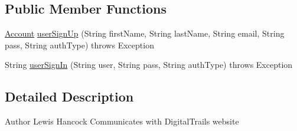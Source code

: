 \subsection*{Public Member Functions}
\begin{DoxyCompactItemize}
\item 
\hyperlink{classuk_1_1ac_1_1swan_1_1digitaltrails_1_1components_1_1_account}{Account} \hyperlink{classuk_1_1ac_1_1swan_1_1digitaltrails_1_1accounts_1_1_digital_trails_com_server_authenticate_a010e082f3db78c10f95d0c8409b68048}{user\+Sign\+Up} (String first\+Name, String last\+Name, String email, String pass, String auth\+Type)  throws Exception 
\item 
String \hyperlink{classuk_1_1ac_1_1swan_1_1digitaltrails_1_1accounts_1_1_digital_trails_com_server_authenticate_af1155247d44e6014be313a575ca195a4}{user\+Sign\+In} (String user, String pass, String auth\+Type)  throws Exception 
\end{DoxyCompactItemize}


\subsection{Detailed Description}
\begin{DoxyAuthor}{Author}
Lewis Hancock Communicates with Digital\+Trails website 
\end{DoxyAuthor}


